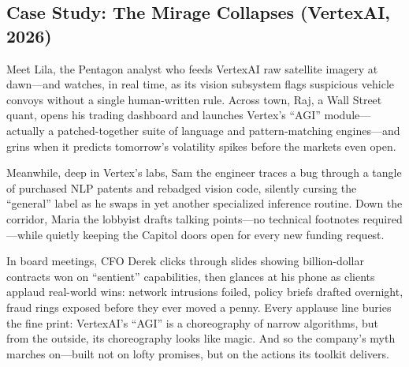 

\subsection{Case Study: The Mirage Collapses (VertexAI, 2026)}

Meet Lila, the Pentagon analyst who feeds VertexAI raw satellite imagery at dawn—and watches, in real time, as its 
vision subsystem flags suspicious vehicle convoys without a single human-written rule. Across town, Raj, a Wall Street 
quant, opens his trading dashboard and launches Vertex’s “AGI” module—actually a patched-together suite of language 
and pattern-matching engines—and grins when it predicts tomorrow’s volatility spikes before the markets even open.

Meanwhile, deep in Vertex’s labs, Sam the engineer traces a bug through a tangle of purchased NLP patents and 
rebadged vision code, silently cursing the “general” label as he swaps in yet another specialized inference routine. 
Down the corridor, Maria the lobbyist drafts talking points—no technical footnotes required—while quietly keeping 
the Capitol doors open for every new funding request.

In board meetings, CFO Derek clicks through slides showing billion-dollar contracts won on “sentient” capabilities, 
then glances at his phone as clients applaud real-world wins: network intrusions foiled, policy briefs drafted 
overnight, fraud rings exposed before they ever moved a penny. Every applause line buries the fine print: VertexAI’s 
“AGI” is a choreography of narrow algorithms, but from the outside, its choreography looks like magic. And so the 
company’s myth marches on—built not on lofty promises, but on the actions its toolkit delivers.


